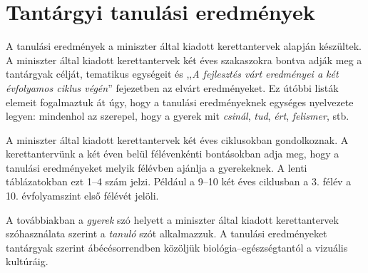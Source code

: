\documentclass[10pt,openright,twoside]{book}
\newcommand{\chaptercover}[1]{
    \cleardoublepage
    
}
\begin{document}



\chaptercover{pics/chapter_covers/6d.JPG}

\chapter{Tantárgyi tanulási eredmények}
\label{sec:tantargyi_tanulasi_eredmenyek}

A tanulási eredmények a miniszter által kiadott kerettantervek \cite{ofi:kerettanterv} alapján készültek. A miniszter által kiadott kerettantervek két éves szakaszokra bontva adják meg a tantárgyak célját, tematikus egységeit és ,,\emph{A fejlesztés várt eredményei a két évfolyamos ciklus végén}'' fejezetben az elvárt eredményeket. Ez útóbbi listák elemeit fogalmaztuk át úgy, hogy a tanulási eredményeknek egységes nyelvezete legyen: mindenhol az szerepel, hogy a gyerek mit \emph{csinál}, \emph{tud}, \emph{ért}, \emph{felismer}, stb.

A miniszter által kiadott kerettantervek két éves ciklusokban gondolkoznak. A kerettantervünk a két éven belül félévenkénti bontásokban adja meg, hogy a tanulási eredményeket melyik félévben ajánlja a gyerekeknek. A lenti táblázatokban ezt 1--4 szám jelzi. Például a 9--10 két éves ciklusban a 3. félév a 10. évfolyamszint első félévét jelöli.

A továbbiakban a \emph{gyerek} szó helyett a miniszter által kiadott kerettantervek szóhasználata szerint a \emph{tanuló} szót alkalmazzuk. A tanulási eredményeket tantárgyak szerint ábécésorrendben közöljük biológia--egész\-ség\-tantól a vizuális kultúráig.


\backmatter
{}
\label{sec:bibliographyk}


\end{document}

